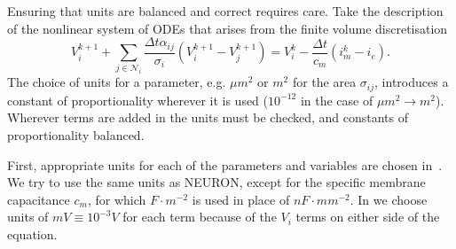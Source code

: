 Ensuring that units are balanced and correct requires care.
Take the description of the nonlinear system of ODEs that arises from the finite volume discretisation
\begin{equation}
    \label{eq:linsys_FV}
      V_i^{k+1} + \sum_{j\in\mathcal{N}_i} {\frac{\Delta t \alpha_{ij}}{\sigma_i} (V_i^{k+1}-V_j^{k+1})}
    = V_i^k - \frac{\Delta t}{c_m}(i_m^{k} - i_e).
\end{equation}
The choice of units for a parameter, e.g. $\mu m^2$ or $m^2$ for the area $\sigma_{ij}$, introduces a constant of proportionality wherever it is used ($10^{-12}$ in the case of $\mu m^2 \rightarrow m^2$).
Wherever terms are added in  the units must be checked, and constants of proportionality balanced.

First, appropriate units for each of the parameters and variables are chosen in~.
We try to use the same units as NEURON, except for the specific membrane capacitance $c_m$, for which $F\cdot m^{-2}$ is used in place of $nF\cdot mm^{-2}$.
In  we choose units of $mV \equiv 10^{-3}V$ for each term because of the $V_i$ terms on either side of the equation.

